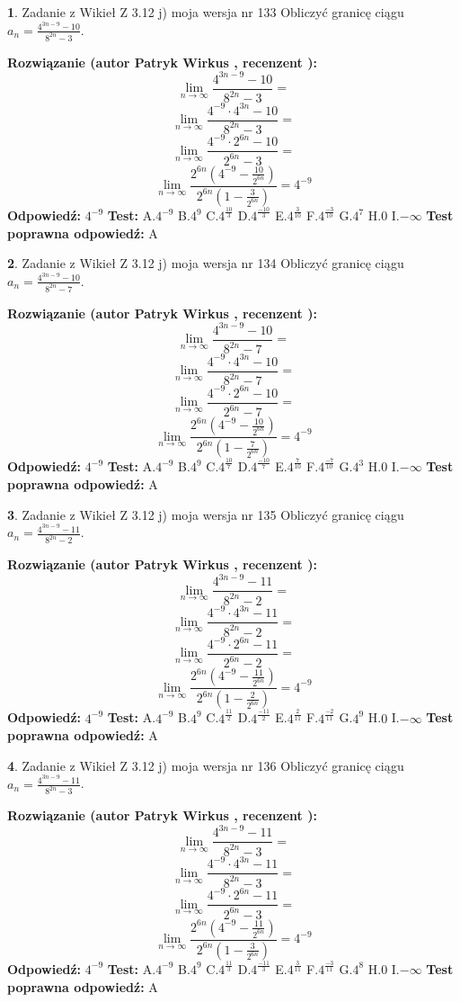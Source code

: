 \documentclass[12pt, a4paper]{article}
\theoremstyle{definition} %
\newtheorem{zad}{}
\newcommand{\zadStart}[1]{\begin{zad}#1\newline}
\newcommand{\zadStop}{\end{zad}}
\newcommand{\rozwStart}[2]{\noindent \textbf{Rozwiązanie (autor #1 , recenzent #2): }\newline}
\newcommand{\rozwStop}{\newline}
\newcommand{\odpStart}{\noindent \textbf{Odpowiedź:}\newline}
\newcommand{\odpStop}{\newline}
\newcommand{\testStart}{\noindent \textbf{Test:}\newline}
\newcommand{\testStop}{\newline}
\newcommand{\kluczStart}{\noindent \textbf{Test poprawna odpowiedź:}\newline}
\newcommand{\kluczStop}{\newline}
\begin{document}
\zadStart{Zadanie z Wikieł Z 3.12 j) moja wersja nr 133}
Obliczyć granicę ciągu $a_{n}=\frac{4^{3n-9}-10}{8^{2n}-3}$.
\zadStop
\rozwStart{Patryk Wirkus}{}
$$\lim\limits_{n\to\infty}\frac{4^{3n-9}-10}{8^{2n}-3}=$$
$$\lim\limits_{n\to\infty}\frac{4^{-9} \cdot 4^{3n}-10}{8^{2n}-3}=$$
$$\lim\limits_{n\to\infty}\frac{4^{-9} \cdot 2^{6n}-10}{2^{6n}-3}=$$
$$\lim\limits_{n\to\infty}\frac{2^{6n}(4^{-9} - \frac{10}{2^{6n}})}{2^{6n}(1-\frac{3}{2^{6n}})}= 4^{-9}$$
\rozwStop
\odpStart
$4^{-9}$
\odpStop
\testStart
A.$4^{-9}$
B.$4^{9}$
C.$4^{\frac{10}{3}}$
D.$4^{\frac{-10}{3}}$
E.$4^{\frac{3}{10}}$
F.$4^{\frac{-3}{10}}$
G.$4^{7}$
H.$0$
I.$-\infty$
\testStop
\kluczStart
A
\kluczStop



\zadStart{Zadanie z Wikieł Z 3.12 j) moja wersja nr 134}
Obliczyć granicę ciągu $a_{n}=\frac{4^{3n-9}-10}{8^{2n}-7}$.
\zadStop
\rozwStart{Patryk Wirkus}{}
$$\lim\limits_{n\to\infty}\frac{4^{3n-9}-10}{8^{2n}-7}=$$
$$\lim\limits_{n\to\infty}\frac{4^{-9} \cdot 4^{3n}-10}{8^{2n}-7}=$$
$$\lim\limits_{n\to\infty}\frac{4^{-9} \cdot 2^{6n}-10}{2^{6n}-7}=$$
$$\lim\limits_{n\to\infty}\frac{2^{6n}(4^{-9} - \frac{10}{2^{6n}})}{2^{6n}(1-\frac{7}{2^{6n}})}= 4^{-9}$$
\rozwStop
\odpStart
$4^{-9}$
\odpStop
\testStart
A.$4^{-9}$
B.$4^{9}$
C.$4^{\frac{10}{7}}$
D.$4^{\frac{-10}{7}}$
E.$4^{\frac{7}{10}}$
F.$4^{\frac{-7}{10}}$
G.$4^{3}$
H.$0$
I.$-\infty$
\testStop
\kluczStart
A
\kluczStop



\zadStart{Zadanie z Wikieł Z 3.12 j) moja wersja nr 135}
Obliczyć granicę ciągu $a_{n}=\frac{4^{3n-9}-11}{8^{2n}-2}$.
\zadStop
\rozwStart{Patryk Wirkus}{}
$$\lim\limits_{n\to\infty}\frac{4^{3n-9}-11}{8^{2n}-2}=$$
$$\lim\limits_{n\to\infty}\frac{4^{-9} \cdot 4^{3n}-11}{8^{2n}-2}=$$
$$\lim\limits_{n\to\infty}\frac{4^{-9} \cdot 2^{6n}-11}{2^{6n}-2}=$$
$$\lim\limits_{n\to\infty}\frac{2^{6n}(4^{-9} - \frac{11}{2^{6n}})}{2^{6n}(1-\frac{2}{2^{6n}})}= 4^{-9}$$
\rozwStop
\odpStart
$4^{-9}$
\odpStop
\testStart
A.$4^{-9}$
B.$4^{9}$
C.$4^{\frac{11}{2}}$
D.$4^{\frac{-11}{2}}$
E.$4^{\frac{2}{11}}$
F.$4^{\frac{-2}{11}}$
G.$4^{9}$
H.$0$
I.$-\infty$
\testStop
\kluczStart
A
\kluczStop



\zadStart{Zadanie z Wikieł Z 3.12 j) moja wersja nr 136}
Obliczyć granicę ciągu $a_{n}=\frac{4^{3n-9}-11}{8^{2n}-3}$.
\zadStop
\rozwStart{Patryk Wirkus}{}
$$\lim\limits_{n\to\infty}\frac{4^{3n-9}-11}{8^{2n}-3}=$$
$$\lim\limits_{n\to\infty}\frac{4^{-9} \cdot 4^{3n}-11}{8^{2n}-3}=$$
$$\lim\limits_{n\to\infty}\frac{4^{-9} \cdot 2^{6n}-11}{2^{6n}-3}=$$
$$\lim\limits_{n\to\infty}\frac{2^{6n}(4^{-9} - \frac{11}{2^{6n}})}{2^{6n}(1-\frac{3}{2^{6n}})}= 4^{-9}$$
\rozwStop
\odpStart
$4^{-9}$
\odpStop
\testStart
A.$4^{-9}$
B.$4^{9}$
C.$4^{\frac{11}{3}}$
D.$4^{\frac{-11}{3}}$
E.$4^{\frac{3}{11}}$
F.$4^{\frac{-3}{11}}$
G.$4^{8}$
H.$0$
I.$-\infty$
\testStop
\kluczStart
A
\kluczStop
\end{document}
